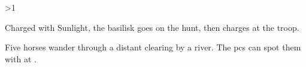 \ifnum\value{temperature}>1

\basilisk
{}

Charged with Sunlight, the \gls{basilisk} goes on the hunt, then charges at the troop.

\else



Five horses wander through a distant clearing by a river.
The \glspl{pc} can spot them with  at \tn[10].

\fi
